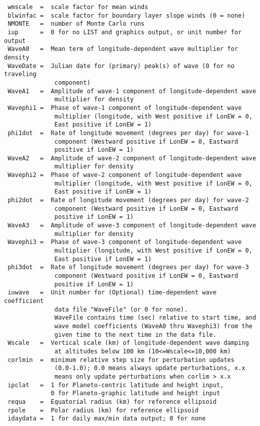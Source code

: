 \begin{lstlisting}
 wmscale  =  scale factor for mean winds
 blwinfac =  scale factor for boundary layer slope winds (0 = none)
 NMONTE   =  number of Monte Carlo runs
 iup      =  0 for no LIST and graphics output, or unit number for output
 WaveA0   =  Mean term of longitude-dependent wave multiplier for density
 WaveDate =  Julian date for (primary) peak(s) of wave (0 for no traveling 
              component) 
 WaveA1   =  Amplitude of wave-1 component of longitude-dependent wave
              multiplier for density
 Wavephi1 =  Phase of wave-1 component of longitude-dependent wave
              multiplier (longitude, with West positive if LonEW = 0,
              East positive if LonEW = 1)
 phi1dot  =  Rate of longitude movement (degrees per day) for wave-1 
              component (Westward positive if LonEW = 0, Eastward 
              positive if LonEW = 1)
 WaveA2   =  Amplitude of wave-2 component of longitude-dependent wave
              multiplier for density
 Wavephi2 =  Phase of wave-2 component of longitude-dependent wave
              multiplier (longitude, with West positive if LonEW = 0,
              East positive if LonEW = 1)
 phi2dot  =  Rate of longitude movement (degrees per day) for wave-2 
              component (Westward positive if LonEW = 0, Eastward 
              positive if LonEW = 1)
 WaveA3   =  Amplitude of wave-3 component of longitude-dependent wave
              multiplier for density
 Wavephi3 =  Phase of wave-3 component of longitude-dependent wave
              multiplier (longitude, with West positive if LonEW = 0,
              East positive if LonEW = 1)
 phi3dot  =  Rate of longitude movement (degrees per day) for wave-3 
              component (Westward positive if LonEW = 0, Eastward 
              positive if LonEW = 1)
 iuwave   =  Unit number for (Optional) time-dependent wave coefficient
              data file "WaveFile" (or 0 for none).
              WaveFile contains time (sec) relative to start time, and
              wave model coefficients (WaveA0 thru Wavephi3) from the
              given time to the next time in the data file.
 Wscale   =  Vertical scale (km) of longitude-dependent wave damping
              at altitudes below 100 km (10<=Wscale<=10,000 km)
 corlmin  =  minimum relative step size for perturbation updates
              (0.0-1.0); 0.0 means always update perturbations, x.x
              means only update perturbations when corlim > x.x
 ipclat   =  1 for Planeto-centric latitude and height input, 
             0 for Planeto-graphic latitude and height input
 requa    =  Equatorial radius (km) for reference ellipsoid
 rpole    =  Polar radius (km) for reference ellipsoid 
 idaydata =  1 for daily max/min data output; 0 for none
 
\end{lstlisting}
 